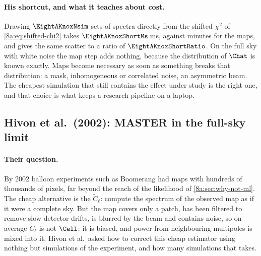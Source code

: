 \paragraph{His shortcut, and what it teaches about cost.}
Drawing $\EightAKnoxNsim$ sets of spectra directly from the shifted $\chi^2$ of
\eqref{8a:eq:shifted-chi2} takes $\EightAKnoxShortMs$\,ms, against minutes for the maps, and gives
the same scatter to a ratio of $\EightAKnoxShortRatio$. On the full sky with white noise the
map step adds nothing, because the distribution of $\Chat$ is known exactly. Maps become
necessary as soon as something breaks that distribution: a mask, inhomogeneous or correlated
noise, an asymmetric beam. The cheapest simulation that still contains the effect under study
is the right one, and that choice is what keeps a research pipeline on a laptop.

\subsection{Hivon et al.\ (2002): MASTER in the full-sky limit}
\label{8a:sec:lit-hivon}

\paragraph{Their question.}
By 2002 balloon experiments such as Boomerang had maps with hundreds of thousands of pixels, far
beyond the reach of the likelihood of \cref{8a:sec:why-not-ml}. The cheap alternative is the
 $\tilde C_\ell$: compute the spectrum of the observed map as if it were a
complete sky. But the map covers only a patch, has been filtered to remove slow detector drifts,
is blurred by the beam and contains noise, so on average $\tilde C_\ell$ is not $\Cell$: it is
biased, and power from neighbouring multipoles is mixed into it. Hivon et al.\ asked how to
correct this cheap estimator using nothing but simulations of the experiment, and how many
simulations that takes.

